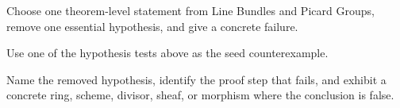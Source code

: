 \begin{exercise}\label{exr:vi42-expand-16}
Choose one theorem-level statement from Line Bundles and Picard Groups, remove one essential hypothesis, and give a concrete failure.
\end{exercise}
\begin{hint}
Use one of the hypothesis tests above as the seed counterexample.
\end{hint}
\begin{solution}
Name the removed hypothesis, identify the proof step that fails, and exhibit a concrete ring, scheme, divisor, sheaf, or morphism where the conclusion is false.
\end{solution}

